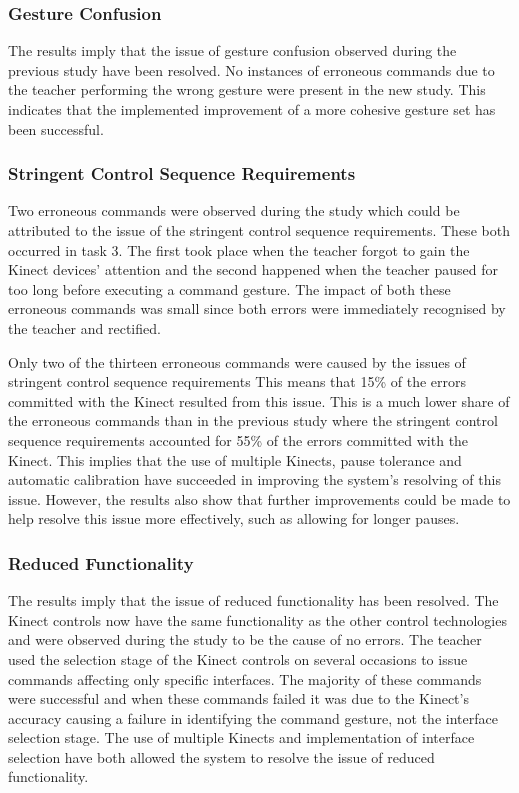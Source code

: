 \documentclass[link]{IWCOMP}
\begin{document}
\subsubsection{Gesture Confusion}
\label{sec:discussionResolutionGestureConfusion}

The results imply that the issue of gesture confusion observed during the previous study have been resolved.
No instances of erroneous commands due to the teacher performing the wrong gesture were present in the new study.
This indicates that the implemented improvement of a more cohesive gesture set has been successful.

\subsubsection{Stringent Control Sequence Requirements}
\label{sec:discussionResolutionStringentControlSequenceRequirements}

Two erroneous commands were observed during the study which could be attributed to the issue of the stringent control sequence requirements.
These both occurred in task 3.
The first took place when the teacher forgot to gain the Kinect devices' attention and the second happened when the teacher paused for too long before executing a command gesture.
The impact of both these erroneous commands was small since both errors were immediately recognised by the teacher and rectified.

Only two of the thirteen erroneous commands were caused by the issues of stringent control sequence requirements
This means that 15\% of the errors committed with the Kinect resulted from this issue.
This is a much lower share of the erroneous commands than in the previous study where the stringent control sequence requirements accounted for 55\% of the errors committed with the Kinect.
This implies that the use of multiple Kinects, pause tolerance and automatic calibration have succeeded in improving the system's resolving of this issue.
However, the results also show that further improvements could be made to help resolve this issue more effectively, such as allowing for longer pauses.

\subsubsection{Reduced Functionality}
\label{sec:discussionResolutionReducedFunctionality}
 
The results imply that the issue of reduced functionality has been resolved.
The Kinect controls now have the same functionality as the other control technologies and were observed during the study to be the cause of no errors.
The teacher used the selection stage of the Kinect controls on several occasions to issue commands affecting only specific interfaces.
The majority of these commands were successful and when these commands failed it was due to the Kinect's accuracy causing a failure in identifying the command gesture, not the interface selection stage.
The use of multiple Kinects and implementation of interface selection have both allowed the system to resolve the issue of reduced functionality.
\end{document}

